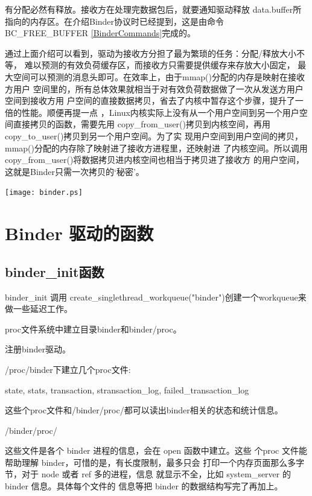 \documentclass[a4paper,11pt]{article}
\begin{document}
有分配必然有释放。接收方在处理完数据包后，就要通知驱动释放
data.buffer所指向的内存区。在介绍Binder协议时已经提到，这是由命令
BC_FREE_BUFFER \autoref{BinderCommands}完成的。

通过上面介绍可以看到，驱动为接收方分担了最为繁琐的任务：分配/释放大小不等，
难以预测的有效负荷缓存区，而接收方只需要提供缓存来存放大小固定，
最大空间可以预测的消息头即可。在效率上，由于mmap()分配的内存是映射在接收方用户
空间里的，所有总体效果就相当于对有效负荷数据做了一次从发送方用户空间到接收方用
户空间的直接数据拷贝，省去了内核中暂存这个步骤，提升了一倍的性能。顺便再提一点
，Linux内核实际上没有从一个用户空间到另一个用户空间直接拷贝的函数，需要先用
copy_from_user()拷贝到内核空间，再用copy_to_user()拷贝到另一个用户空间。为了实
现用户空间到用户空间的拷贝，mmap()分配的内存除了映射进了接收方进程里，还映射进
了内核空间。所以调用copy_from_user()将数据拷贝进内核空间也相当于拷贝进了接收方
的用户空间，这就是Binder只需一次拷贝的‘秘密’。

\texttt{[image: binder.ps]}

\section{Binder 驱动的函数}
\subsection{binder_init函数} 
\begin{itemize*}
    \item binder_init 调用 create_singlethread_workqueue("binder")创建一个workqueue来做一些延迟工作。
    \item proc文件系统中建立目录binder和binder/proc。
    \item 注册binder驱动。
    \item /proc/binder下建立几个proc文件:
        \begin{itemize*}
            \item state, stats, transaction, stransaction_log, failed_transaction_log

                这些个proc文件和/binder/proc/都可以读出binder相关的状态和统计信息。
            \item /binder/proc/

                 这些文件是各个 binder 进程的信息，会在 open 函数中建立。这些
                 个proc 文件能帮助理解 binder，可惜的是，有长度限制，最多只会
                 打印一个内存页面那么多字节，对于 node 或者 ref 多的进程，信息
                 就显示不全，比如 system_server 的 binder 信息。具体每个文件的
                 信息等把 binder 的数据结构写完了再加上。
        \end{itemize*}

\end{itemize*}
\end{document}
